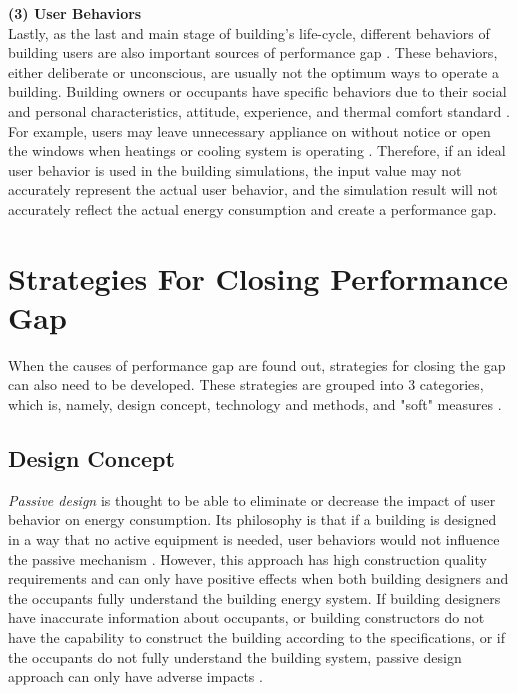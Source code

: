\documentclass[a4paper, oneside]{discothesis}
\begin{document}
		\textbf{(3) User Behaviors}\\
		Lastly, as the last and main stage of building's life-cycle, different behaviors of building users are also important sources of performance gap \cite{ZOU2018165}. These behaviors, either deliberate or unconscious, are usually not the optimum ways to operate a building. Building owners or occupants have specific behaviors due to their social and personal characteristics, attitude, experience, and thermal comfort standard \cite{userevaluations,LAWRENCE2016651}. For example, users may leave unnecessary appliance on without notice or open the windows when heatings or cooling system is operating \cite{FREI2017421}. Therefore, if an ideal user behavior is used in the building simulations, the input value may not accurately represent the actual user behavior, and the simulation result will not accurately reflect the actual energy consumption and create a performance gap.\\

	\section{Strategies For Closing Performance Gap} 
		When the causes of performance gap are found out, strategies for closing the gap can also need to be developed. These strategies are grouped into 3 categories, which is, namely, design concept, technology and methods, and "soft" measures \cite{ZOU2018165}.

		\subsection{Design Concept}
			\textit{Passive design} is thought to be able to eliminate or decrease the impact of user behavior on energy consumption. Its philosophy is that if a building is designed in a way that no active equipment is needed, user behaviors would not influence the passive mechanism \cite{BLIGHT2013183,NORFORD1994121}. However, this approach has high construction quality requirements and can only have positive effects when both building designers and the occupants fully understand the building energy system. If building designers have inaccurate information about occupants, or building constructors do not have the capability to construct the building according to the specifications, or if the occupants do not fully understand the building system, passive design approach can only have adverse impacts \cite{ZOU2018165}.\\
\end{document}
